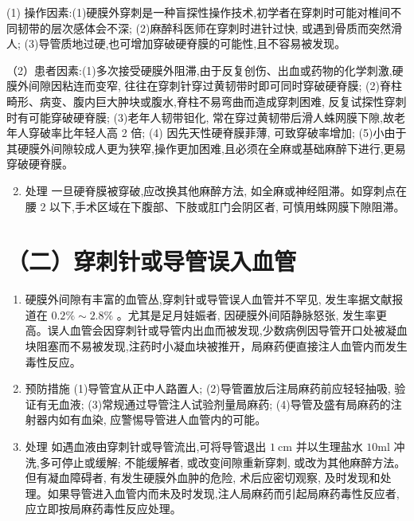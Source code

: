 \documentclass[10pt]{article}
\begin{document}
(1) 操作因素:(1)硬膜外穿刺是一种盲探性操作技术,初学者在穿刺时可能对椎间不同韧带的层次感体会不深; (2)麻醉科医师在穿刺时进针过快, 或遇到骨质而突然滑人; (3)导管质地过硬,也可增加穿破硬脊膜的可能性,且不容易被发现。

（2）患者因素:(1)多次接受硬膜外阻滞,由于反复创伤、出血或药物的化学刺激,硬膜外间隙因粘连而变窄, 往往在穿刺针穿过黄韧带时即可同时穿破硬脊膜; (2)脊柱畸形、病变、腹内巨大肿块或腹水,脊柱不易弯曲而造成穿刺困难, 反复试探性穿刺时有可能穿破硬脊膜; (3)老年人韧带钽化, 常在穿过黄韧带后滑人蛛网膜下隙,故老年人穿破率比年轻人高 2 倍; (4) 因先天性硬脊膜菲薄, 可致穿破率增加; (5)小由于其硬膜外间隙较成人更为狭窄,操作更加困难,且必须在全麻或基础麻醉下进行,更易穿破硬脊膜。

\begin{enumerate}
  \setcounter{enumi}{1}
  \item 处理 一旦硬脊膜被穿破,应改换其他麻醉方法, 如全麻或神经阻滞。如穿刺点在腰 2 以下,手术区域在下腹部、下肢或肛门会阴区者, 可慎用蛛网膜下隙阻滞。
\end{enumerate}

\section*{（二）穿刺针或导管误入血管}
\begin{enumerate}
  \item 硬膜外间隙有丰富的血管丛,穿刺针或导管误人血管并不罕见, 发生率据文献报道在 $0.2 \% \sim 2.8 \%$ 。尤其是足月娃娠者, 因硬膜外间陌静脉怒张, 发生率更高。误人血管会因穿刺针或导管内出血而被发现,少数病例因导管开口处被凝血块阻塞而不易被发现,注药时小凝血块被推开，局麻药便直接注人血管内而发生毒性反应。

  \item 预防措施 (1)导管宜从正中人路置人; (2)导管置放后注局麻药前应轻轻抽吸, 验证有无血液; (3)常规通过导管注人试验剂量局麻药; (4)导管及盛有局麻药的注射器内如有血染, 应警惕导管进人血管内的可能。

  \item 处理 如遇血液由穿刺针或导管流出,可将导管退出 $1 \mathrm{~cm}$ 并以生理盐水 $10 \mathrm{ml}$ 冲洗,多可停止或缓解; 不能缓解者, 或改变间隙重新穿刺, 或改为其他麻醉方法。但有凝血障碍者, 有发生硬膜外血肿的危险, 术后应密切观察, 及时发现和处理。如果导管进入血管内而未及时发现,注人局麻药而引起局麻药毒性反应者, 应立即按局麻药毒性反应处理。

\end{enumerate}
\end{document}
